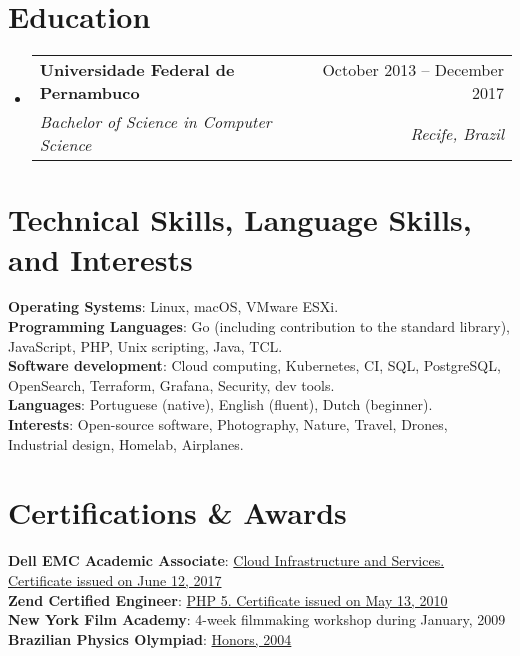 \documentclass[letterpaper,10pt]{article}
\makeatletter
\newcommand{\resumeSubheading}[4]{
  \vspace{-2pt}\item
    \begin{tabular*}{0.97\textwidth}[t]{l@{\extracolsep{\fill}}r}
      \textbf{#1} & #2 \\
      \textit{\small#3} & \textit{\small #4} \\
    \end{tabular*}\vspace{-7pt}
}
\newcommand{\resumeSubHeadingListStart}{\begin{itemize}[leftmargin=0.15in, label={}]}
\newcommand{\resumeSubHeadingListEnd}{\end{itemize}}
\makeatother
\begin{document}
\vspace{-2pt}
\section{Education}
  \resumeSubHeadingListStart
      \resumeSubheading
      {Universidade Federal de Pernambuco}{October 2013 -- December 2017}
      {Bachelor of Science in Computer Science}{Recife, Brazil}
  \resumeSubHeadingListEnd

\section{Technical Skills, Language Skills, and Interests}
 \begin{itemize}[leftmargin=0.15in, label={}]
    \small{\item{
    \textbf{Operating Systems}{: Linux, macOS, VMware ESXi.} \\
     \textbf{Programming Languages}{: Go (including contribution to the standard library), JavaScript, PHP, Unix scripting, Java, TCL.} \\
     \textbf{Software development}{: Cloud computing, Kubernetes, CI, SQL, PostgreSQL, OpenSearch, Terraform, Grafana, Security, dev tools.} \\
     \textbf{Languages}{: Portuguese (native), English (fluent), Dutch (beginner).} \\
     \textbf{Interests}{: Open-source software, Photography, Nature, Travel, Drones, Industrial design, Homelab, Airplanes.}
    }}
 \end{itemize}

\section{Certifications \& Awards}
 \begin{itemize}[leftmargin=0.15in, label={}]
    \small{\item{
     \textbf{Dell EMC Academic Associate}{: \href{https://www.certmetrics.com/DellEmc/public/verification.aspx?code=Z043ZNDTJMB11QS1}{Cloud Infrastructure and Services. Certificate issued on June 12, 2017}} \\
     \textbf{Zend Certified Engineer}{: \href{https://www.zend-zce.com/en/yellow-pages/ZEND013948}{PHP 5. Certificate issued on May 13, 2010}} \\
     \textbf{New York Film Academy}{: 4-week filmmaking workshop during January, 2009} \\
     \textbf{Brazilian Physics Olympiad}{: \href{https://sec.sbfisica.org.br/olimpiadas/obf2004/resultadofinal_2serie.htm}{Honors, 2004}}
     }}
 \end{itemize}
\end{document}
